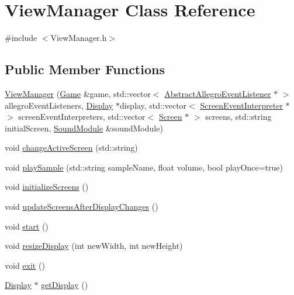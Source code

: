 \hypertarget{classViewManager}{}\section{View\+Manager Class Reference}
\label{classViewManager}


{\ttfamily \#include $<$View\+Manager.\+h$>$}

\subsection*{Public Member Functions}
\begin{DoxyCompactItemize}
\item 
\hyperlink{classViewManager_a684ecb6174c1af078bb112fd568d24e3}{View\+Manager} (\hyperlink{classGame}{Game} \&game, std\+::vector$<$ \hyperlink{classAbstractAllegroEventListener}{Abstract\+Allegro\+Event\+Listener} $\ast$ $>$ allegro\+Event\+Listeners, \hyperlink{classDisplay}{Display} $\ast$display, std\+::vector$<$ \hyperlink{classScreenEventInterpreter}{Screen\+Event\+Interpreter} $\ast$ $>$ screen\+Event\+Interpreters, std\+::vector$<$ \hyperlink{classScreen}{Screen} $\ast$ $>$ screens, std\+::string initial\+Screen, \hyperlink{classSoundModule}{Sound\+Module} \&sound\+Module)
\item 
void \hyperlink{classViewManager_af91f677e59971904b9787ba8770b378e}{change\+Active\+Screen} (std\+::string)
\item 
void \hyperlink{classViewManager_a9ce139d86ba73580c327cd2eac4763b4}{play\+Sample} (std\+::string sample\+Name, float volume, bool play\+Once=true)
\item 
void \hyperlink{classViewManager_a8201bca571eb89c02dc0fd6c1da5018e}{initialize\+Screens} ()
\item 
void \hyperlink{classViewManager_ac340733c77d4d0ed4dbe453a86b465b0}{update\+Screens\+After\+Display\+Changes} ()
\item 
void \hyperlink{classViewManager_a0f797d9cb4e2306276dd4419d20d3fc7}{start} ()
\item 
void \hyperlink{classViewManager_a32c0f403834b720da90683066be6facc}{resize\+Display} (int new\+Width, int new\+Height)
\item 
void \hyperlink{classViewManager_a06d7d534bc170365d39b4dba37f09005}{exit} ()
\item 
\hyperlink{classDisplay}{Display} $\ast$ \hyperlink{classViewManager_a7758c09a2eb1ddb2c43292f5e441991e}{get\+Display} ()
\end{DoxyCompactItemize}


